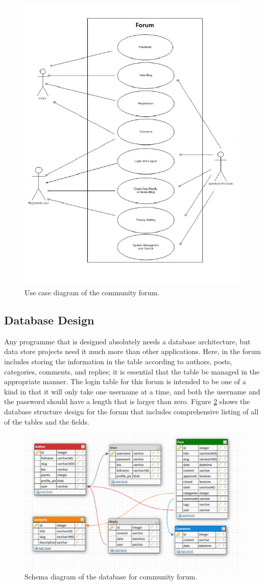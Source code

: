 \begin{figure}[!h]
	\centering
	\includegraphics[width=0.8\linewidth]{usecase}
	\caption{Use case diagram of the community forum.}
	\label{fig:7}
\end{figure}

\subsection{Database Design}
Any programme that is designed absolutely needs a database architecture, but data store projects need it much more than other applications. Here, in the forum includes storing the information in the table according to authors, posts, categories, comments, and replies; it is essential that the table be managed in the appropriate manner. The login table for this forum is intended to be one of a kind in that it will only take one username at a time, and both the username and the password should have a length that is larger than zero. Figure \ref{fig:8} shows the database structure design for the forum that includes comprehensive listing of all of the tables and the fields.

\begin{figure}[!h]
	\centering
	\includegraphics[width=\linewidth]{database}
	\caption{Schema diagram of the database for community forum.}
	\label{fig:8}
\end{figure}

\def\baselinestretch{1.66}
\medskip

